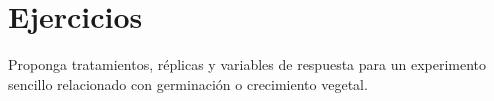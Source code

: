 \section{Ejercicios}
Proponga tratamientos, réplicas y variables de respuesta para un experimento sencillo relacionado con germinación o crecimiento vegetal.